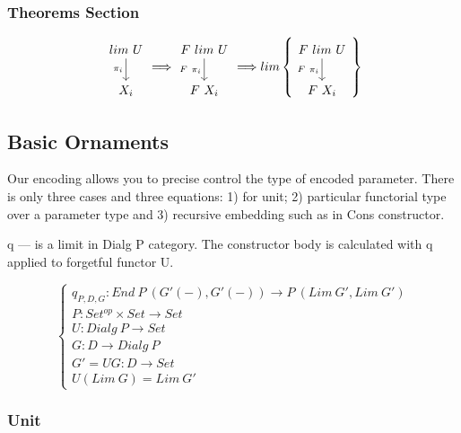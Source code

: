 \documentclass[11pt,oneside]{article}
\begin{document}
\subsubsection*{Theorems Section}

\begin{center}
$$
\begin{tikzcd}
  lim\ U \arrow{d}[left]{\pi_i} \\
  X_i
\end{tikzcd}
\Longrightarrow
\begin{tikzcd}
  F\ lim\ U \arrow{d}[left]{F\ \pi_i} \\
  F\ X_i
\end{tikzcd}
\Longrightarrow
lim\left\{
\begin{tikzcd}
  F\ lim\ U \arrow{d}[left]{F\ \pi_i} \\
  F\ X_i
\end{tikzcd}
\right\}
$$
\end{center}

\subsection{Basic Ornaments}

Our encoding allows you to precise control the type of encoded parameter.
There is only three cases and three equations: 1) for unit; 2) particular
functorial type over a parameter type and 3) recursive embedding such as
in Cons constructor.

q — is a limit in Dialg P category. The constructor body is calculated
with q applied to forgetful functor U.

$$
\begin{cases}
q_{P,D,G} : End\ P\ (G'(-),G'(-)) \rightarrow P\ (Lim\ G',Lim\ G') \\
P : Set^{op} \times Set \rightarrow Set \\
U : Dialg\ P \rightarrow Set \\
G : D \rightarrow Dialg\ P \\
G' = UG : D \rightarrow Set \\
U (Lim\ G) = Lim\ G'
\end{cases}
$$

\subsubsection{Unit}
\end{document}
